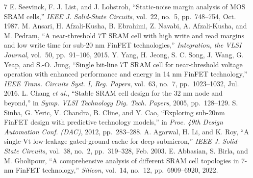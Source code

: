 \documentclass[conference]{IEEEtran}
\begin{document}
\begin{thebibliography}{7}
 E. Seevinck, F. J. List, and J. Lohstroh, ``Static-noise margin analysis of MOS SRAM cells,'' \emph{IEEE J. Solid-State Circuits}, vol.~22, no.~5, pp.~748--754, Oct. 1987.
 M. Ansari, H. Afzali-Kusha, B. Ebrahimi, Z. Navabi, A. Afzali-Kusha, and M. Pedram, ``A near-threshold 7T SRAM cell with high write and read margins and low write time for sub-20 nm FinFET technologies,'' \emph{Integration, the VLSI Journal}, vol.~50, pp.~91--106, 2015.
 Y. Yang, H. Jeong, S. C. Song, J. Wang, G. Yeap, and S.-O. Jung, ``Single bit-line 7T SRAM cell for near-threshold voltage operation with enhanced performance and energy in 14 nm FinFET technology,'' \emph{IEEE Trans. Circuits Syst. I, Reg. Papers}, vol.~63, no.~7, pp.~1023--1032, Jul. 2016.
 L. Chang \emph{et al.}, ``Stable SRAM cell design for the 32 nm node and beyond,'' in \emph{Symp. VLSI Technology Dig. Tech. Papers}, 2005, pp.~128--129.
 S. Sinha, G. Yeric, V. Chandra, B. Cline, and Y. Cao, ``Exploring sub-20nm FinFET design with predictive technology models,'' in \emph{Proc. 49th Design Automation Conf. (DAC)}, 2012, pp.~283--288.
 A. Agarwal, H. Li, and K. Roy, ``A single-Vt low-leakage gated-ground cache for deep submicron,'' \emph{IEEE J. Solid-State Circuits}, vol.~38, no.~2, pp.~319--328, Feb. 2003.
 E. Abbasian, S. Birla, and M. Gholipour, ``A comprehensive analysis of different SRAM cell topologies in 7-nm FinFET technology,'' \emph{Silicon}, vol.~14, no.~12, pp.~6909--6920, 2022.
\end{thebibliography}
\end{document}
